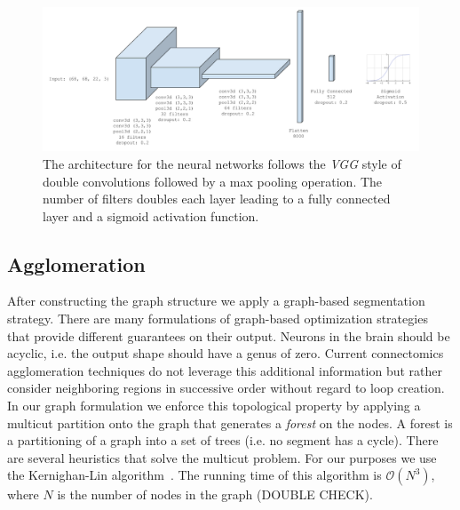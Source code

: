 \begin{figure}[t]
	\centering
	\includegraphics[width=0.95\linewidth]{figures/architecture.png}
	\caption{The architecture for the neural networks follows the \textit{VGG} style of double convolutions followed by a max pooling operation. The number of filters doubles each layer leading to a fully connected layer and a sigmoid activation function.}
	\label{fig:architecture}
\end{figure}

\subsection{Agglomeration}

After constructing the graph structure we apply a graph-based segmentation strategy. 
There are many formulations of graph-based optimization strategies that provide different guarantees on their output. 
Neurons in the brain should be acyclic, i.e. the output shape should have a genus of zero. 
Current connectomics agglomeration techniques do not leverage this additional information but rather consider neighboring regions in successive order without regard to loop creation. 
In our graph formulation we enforce this topological property by applying a multicut partition onto the graph that generates a \textit{forest} on the nodes. 
A forest is a partitioning of a graph into a set of trees (i.e. no segment has a cycle). 
There are several heuristics that solve the multicut problem. For our purposes we use the Kernighan-Lin algorithm~\cite{kernighan1970efficient}.
The running time of this algorithm is $\mathcal{O}(N^3)$, where $N$ is the number of nodes in the graph (DOUBLE CHECK). 